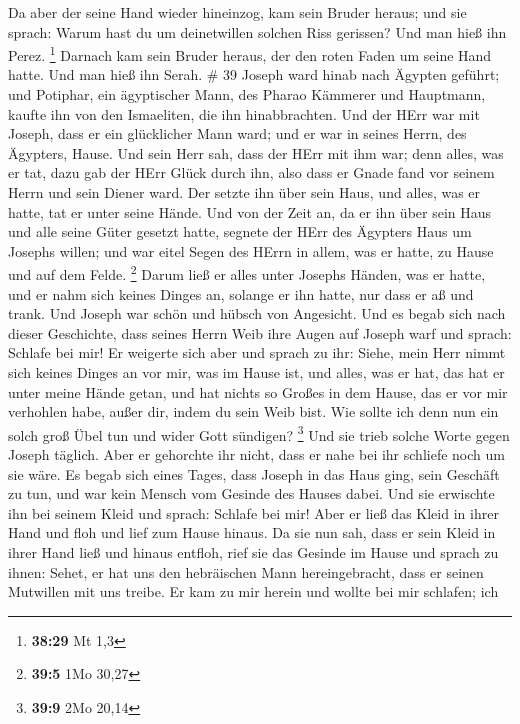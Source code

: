  Da aber der seine Hand wieder hineinzog, kam sein Bruder
heraus; und sie sprach: Warum hast du um deinetwillen solchen Riss
gerissen? Und man hieß ihn Perez. \footnote{\textbf{38:29} Mt 1,3}
 Darnach kam sein Bruder heraus, der den roten Faden um
seine Hand hatte. Und man hieß ihn Serah. \# 39  Joseph ward
hinab nach Ägypten geführt; und Potiphar, ein ägyptischer Mann, des
Pharao Kämmerer und Hauptmann, kaufte ihn von den Ismaeliten, die ihn
hinabbrachten.  Und der HErr war mit Joseph, dass er ein
glücklicher Mann ward; und er war in seines Herrn, des Ägypters, Hause.
 Und sein Herr sah, dass der HErr mit ihm war; denn alles,
was er tat, dazu gab der HErr Glück durch ihn,  also dass er
Gnade fand vor seinem Herrn und sein Diener ward. Der setzte ihn über
sein Haus, und alles, was er hatte, tat er unter seine Hände.
 Und von der Zeit an, da er ihn über sein Haus und alle
seine Güter gesetzt hatte, segnete der HErr des Ägypters Haus um Josephs
willen; und war eitel Segen des HErrn in allem, was er hatte, zu Hause
und auf dem Felde. \footnote{\textbf{39:5} 1Mo 30,27}  Darum
ließ er alles unter Josephs Händen, was er hatte, und er nahm sich
keines Dinges an, solange er ihn hatte, nur dass er aß und trank. Und
Joseph war schön und hübsch von Angesicht.  Und es begab
sich nach dieser Geschichte, dass seines Herrn Weib ihre Augen auf
Joseph warf und sprach: Schlafe bei mir!  Er weigerte sich
aber und sprach zu ihr: Siehe, mein Herr nimmt sich keines Dinges an vor
mir, was im Hause ist, und alles, was er hat, das hat er unter meine
Hände getan,  und hat nichts so Großes in dem Hause, das er
vor mir verhohlen habe, außer dir, indem du sein Weib bist. Wie sollte
ich denn nun ein solch groß Übel tun und wider Gott sündigen?
\footnote{\textbf{39:9} 2Mo 20,14}  Und sie trieb solche
Worte gegen Joseph täglich. Aber er gehorchte ihr nicht, dass er nahe
bei ihr schliefe noch um sie wäre.  Es begab sich eines
Tages, dass Joseph in das Haus ging, sein Geschäft zu tun, und war kein
Mensch vom Gesinde des Hauses dabei.  Und sie erwischte ihn
bei seinem Kleid und sprach: Schlafe bei mir! Aber er ließ das Kleid in
ihrer Hand und floh und lief zum Hause hinaus.  Da sie nun
sah, dass er sein Kleid in ihrer Hand ließ und hinaus entfloh,
 rief sie das Gesinde im Hause und sprach zu ihnen: Sehet,
er hat uns den hebräischen Mann hereingebracht, dass er seinen Mutwillen
mit uns treibe. Er kam zu mir herein und wollte bei mir schlafen; ich
